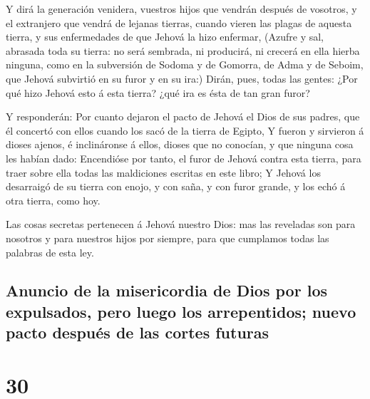  Y dirá la generación venidera, vuestros hijos que vendrán
después de vosotros, y el extranjero que vendrá de lejanas tierras,
cuando vieren las plagas de aquesta tierra, y sus enfermedades de que
Jehová la hizo enfermar,  (Azufre y sal, abrasada toda su
tierra: no será sembrada, ni producirá, ni crecerá en ella hierba
ninguna, como en la subversión de Sodoma y de Gomorra, de Adma y de
Seboim, que Jehová subvirtió en su furor y en su ira:) 
Dirán, pues, todas las gentes: ¿Por qué hizo Jehová esto á esta tierra?
¿qué ira es ésta de tan gran furor?

 Y responderán: Por cuanto dejaron el pacto de Jehová el
Dios de sus padres, que él concertó con ellos cuando los sacó de la
tierra de Egipto,  Y fueron y sirvieron á dioses ajenos, é
inclináronse á ellos, dioses que no conocían, y que ninguna cosa les
habían dado:  Encendióse por tanto, el furor de Jehová
contra esta tierra, para traer sobre ella todas las maldiciones escritas
en este libro;  Y Jehová los desarraigó de su tierra con
enojo, y con saña, y con furor grande, y los echó á otra tierra, como
hoy.

 Las cosas secretas pertenecen á Jehová nuestro Dios: mas
las reveladas son para nosotros y para nuestros hijos por siempre, para
que cumplamos todas las palabras de esta ley.

\hypertarget{anuncio-de-la-misericordia-de-dios-por-los-expulsados-pero-luego-los-arrepentidos-nuevo-pacto-despuuxe9s-de-las-cortes-futuras}{%
\subsection{Anuncio de la misericordia de Dios por los expulsados, pero
luego los arrepentidos; nuevo pacto después de las cortes
futuras}\label{anuncio-de-la-misericordia-de-dios-por-los-expulsados-pero-luego-los-arrepentidos-nuevo-pacto-despuuxe9s-de-las-cortes-futuras}}

\hypertarget{section-29}{%
\section{30}\label{section-29}}

